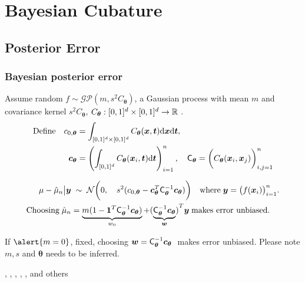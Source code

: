 \documentclass[handout, 10pt,compress,xcolor={usenames,dvipsnames}]{beamer} %
\newcommand{\bm}[1]{\boldsymbol{#1}}
\newcommand{\mCtheta}{\mC_{\vtheta}}
\newcommand{\mCthetaInv}{{\mathsf{C}^{-1}_{\vtheta}}}
\newcommand{\dvx}{\dif {\vx}}
\newcommand{\dvt}{\dif {\vt}}
\renewcommand{\vtheta}{{\bm{\theta}}}
\newcommand{\pause}{}
\begin{document}
\section{Bayesian Cubature}


\subsection{Posterior Error}


\begin{frame}
\frametitle{Bayesian posterior error}
\vspace*{-4ex}
\alert{Assume random}
$f \sim \mathcal{GP} (m, s^2C_{\vtheta})$,
a \alert{Gaussian process} with mean $m$ and covariance kernel $s^2C_{\vtheta}$, $C_{\vtheta}:[0,1]^d \times [0,1]^d \to \reals$ .
\vspace*{-1ex}
\begin{align*}
\text{Define} \quad c_{0,\vtheta} &= \int_{[0,1]^d \times [0,1]^d} C_{\vtheta} (\vx,\vt) \dvx \dvt, 
\\
\vc_{\vtheta}& = \left( \int_{[0,1]^d } C_{\vtheta} (\vx_i,\vt) \dvt \right)_{i=1}^n,
\quad
\mCtheta =  \biggl( C_{\vtheta} (\vx_i,\vx_j) \biggr)_{i,j=1}^n
\end{align*}
\pause
\vspace*{-3ex}
\begin{align*}
\mu - \hmu_n  \big \vert \vy & \; \sim \;
\cn
\biggl( %
0, \quad s^2(c_{0,\vtheta} - \vc_{\vtheta} ^T \mCthetaInv \vc_{\vtheta})
\biggr)
\quad %
\text{where} \; \vy = \bigl(f(\vx_i)\bigr)_{i=1}^n. 
\\
\text{Choosing} \; \hmu_n &= \underbrace{m(1 - \vone^T \mCthetaInv \vc_{\vtheta})}_{w_0} + {(\underbrace{\mCthetaInv \vc_{\vtheta}}_{\vw})}^T \vy \; \text{makes error unbiased.} 
\end{align*}
\pause
If $\alert{m = 0}$, fixed, choosing $\vw = \mCthetaInv\vc_{\vtheta} \;$ makes error unbiased. Please note \alert{$m, s$ and $\vtheta$} needs to be inferred.

, , , , ,  and others
\end{frame}
\end{document}
